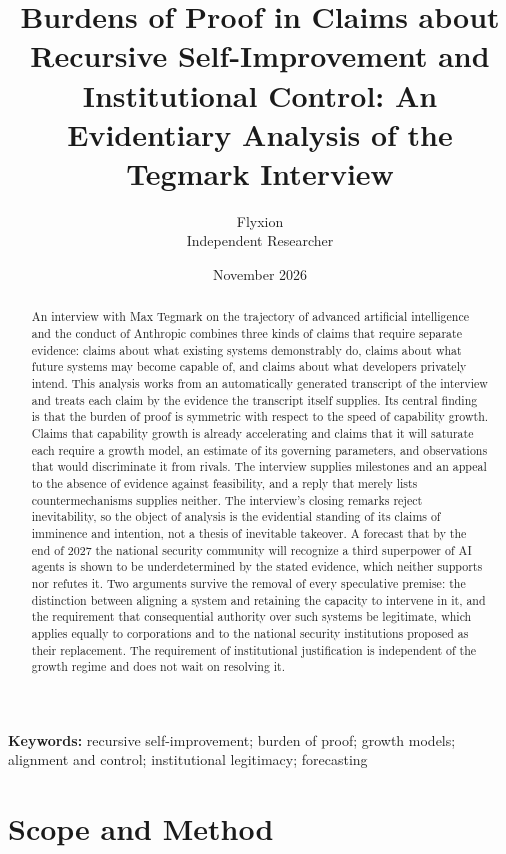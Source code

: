 \documentclass[11pt]{article}
\title{Burdens of Proof in Claims about Recursive Self-Improvement and Institutional Control: An Evidentiary Analysis of the Tegmark Interview}
\author{Flyxion\\Independent Researcher}
\date{November 2026}
\begin{document}
\maketitle

\begin{abstract}
\noindent An interview with Max Tegmark on the trajectory of advanced artificial intelligence and the conduct of Anthropic combines three kinds of claims that require separate evidence: claims about what existing systems demonstrably do, claims about what future systems may become capable of, and claims about what developers privately intend. This analysis works from an automatically generated transcript of the interview and treats each claim by the evidence the transcript itself supplies. Its central finding is that the burden of proof is symmetric with respect to the speed of capability growth. Claims that capability growth is already accelerating and claims that it will saturate each require a growth model, an estimate of its governing parameters, and observations that would discriminate it from rivals. The interview supplies milestones and an appeal to the absence of evidence against feasibility, and a reply that merely lists countermechanisms supplies neither. The interview's closing remarks reject inevitability, so the object of analysis is the evidential standing of its claims of imminence and intention, not a thesis of inevitable takeover. A forecast that by the end of 2027 the national security community will recognize a third superpower of AI agents is shown to be underdetermined by the stated evidence, which neither supports nor refutes it. Two arguments survive the removal of every speculative premise: the distinction between aligning a system and retaining the capacity to intervene in it, and the requirement that consequential authority over such systems be legitimate, which applies equally to corporations and to the national security institutions proposed as their replacement. The requirement of institutional justification is independent of the growth regime and does not wait on resolving it.
\end{abstract}

\vspace{1.5em}
\noindent\textbf{Keywords:} recursive self-improvement; burden of proof; growth models; alignment and control; institutional legitimacy; forecasting

\clearpage

\section{Scope and Method}
\end{document}
